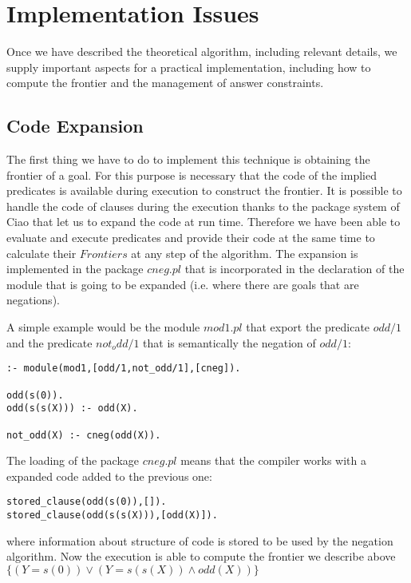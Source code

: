 \documentclass{llncs}
\begin{document}
    


\section{Implementation Issues}
\label{implementation}

Once we have described the theoretical algorithm, including relevant
details, we supply important aspects for a practical implementation, including how
to compute the frontier and the management of answer constraints.


\subsection{Code Expansion}
\label{expansion}

The first thing we have to do to implement this technique is obtaining
the frontier of a goal. For this purpose is necessary that the code of
the implied predicates is available during execution to construct the
frontier. It is possible to handle the code of clauses during the
execution thanks to the package system of Ciao
\cite{ciao-modules-cl2000} that let us to expand the code at run time.
Therefore we have been able to evaluate and execute predicates and
provide their code at the same time to calculate their $Frontiers$ at
any step of the algorithm. The expansion is implemented in the package
$cneg.pl$ that is incorporated in the declaration of the module that
is going to be expanded (i.e. where there are goals that are
negations).

A simple example would be the module $mod1.pl$ that export the predicate $odd/1$ and the predicate $not_odd/1$ that is semantically the negation of $odd/1$: 
\begin{verbatim}
:- module(mod1,[odd/1,not_odd/1],[cneg]).

odd(s(0)).
odd(s(s(X))) :- odd(X).

not_odd(X) :- cneg(odd(X)).
\end{verbatim}
The loading of the package $cneg.pl$ means 
that the compiler works with a expanded code added to the previous one:
\begin{verbatim}
stored_clause(odd(s(0)),[]).
stored_clause(odd(s(s(X))),[odd(X)]).
\end{verbatim}
where information about structure of code is stored to be used by the
negation algorithm. Now the execution is able to compute the frontier
we describe above $\{ ( Y=s(0) ) \vee ( Y=s(s(X)) \wedge odd(X) ) \}$
\end{document}
